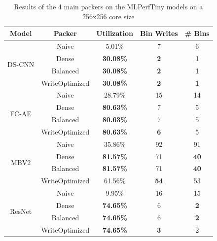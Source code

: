 \begin{table}[h]
\caption{Results of the 4 main packers on the MLPerfTiny models on a 256x256 core size}
\label{table:marp_on_mlperftiny}
\centering
\begin{tabular}{ccccc}
\hline
\textbf{Model} & \textbf{Packer} & \textbf{Utilization} & \textbf{Bin Writes} & \textbf{\# Bins} \\ \hline
\multirow{4}{*}{DS-CNN} & Naive          & 5.01\%           & 7           & 6           \\ \cline{2-5} 
                        & Dense          & \textbf{30.08\%} & \textbf{2}  & \textbf{1}  \\
                        & Balanced       & \textbf{30.08\%} & \textbf{2}  & \textbf{1}  \\
               & WriteOptimized  & \textbf{30.08\%}     & \textbf{2}          & \textbf{1}       \\ \hline
\multirow{4}{*}{FC-AE}  & Naive          & 28.79\%          & 15          & 14          \\ \cline{2-5} 
                        & Dense          & \textbf{80.63\%} & 7           & 5           \\
                        & Balanced       & \textbf{80.63\%} & 7           & 5           \\
                        & WriteOptimized & \textbf{80.63\%} & \textbf{6}  & 5           \\ \hline
\multirow{4}{*}{MBV2}   & Naive          & 35.86\%          & 92          & 91          \\ \cline{2-5} 
                        & Dense          & \textbf{81.57\%} & 71          & \textbf{40} \\
                        & Balanced       & \textbf{81.57\%} & 71          & \textbf{40} \\
                        & WriteOptimized & 61.56\%          & \textbf{54} & 53          \\ \hline
\multirow{4}{*}{ResNet} & Naive          & 9.95\%           & 16          & 15          \\ \cline{2-5} 
                        & Dense          & \textbf{74.65\%} & 6           & \textbf{2}  \\
                        & Balanced       & \textbf{74.65\%} & 6           & \textbf{2}  \\
                        & WriteOptimized & \textbf{74.65\%} & \textbf{3}  & 2          
\end{tabular}
\end{table}

